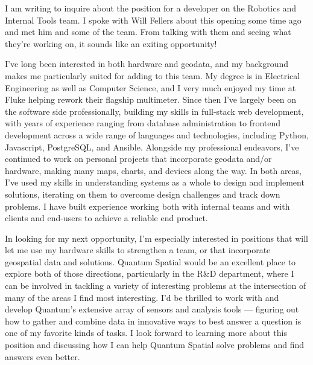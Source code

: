 \documentclass[10pt,stdletter,dateno,sigleft]{newlfm} %
\begin{document}
\begin{newlfm}


I am writing to inquire about the position for a developer on the Robotics and Internal Tools team. I spoke with Will Fellers about this opening some time ago and met him and some of the team. From talking with them and seeing what they're working on, it sounds like an exiting opportunity!

I've long been interested in both hardware and geodata, and my background makes me particularly suited for adding to this team. My degree is in Electrical Engineering as well as Computer Science, and I very much enjoyed my time at Fluke helping rework their flagship multimeter. Since then I've largely been on the software side professionally, building my skills in full-stack web development, with years of experience ranging from database administration to frontend development across a wide range of languages and technologies, including Python, Javascript, PostgreSQL, and Ansible. Alongside my professional endeavors, I've continued to work on personal projects that incorporate geodata and/or hardware, making many maps, charts, and devices along the way. In both areas, I've used my skills in understanding systems as a whole to design and implement solutions, iterating on them to overcome design challenges and track down problems. I have built experience working both with internal teams and with clients and end-users to achieve a reliable end product.

In looking for my next opportunity, I'm especially interested in positions that will let me use my hardware skills to strengthen a team, or that incorporate geospatial data and solutions. Quantum Spatial would be an excellent place to explore both of those directions, particularly in the R\&D department, where I can be involved in tackling a variety of interesting problems at the intersection of many of the areas I find most interesting. I'd be thrilled to work with and develop Quantum's extensive array of sensors and analysis tools — figuring out how to gather and combine data in innovative ways to best answer a question is one of my favorite kinds of tasks. I look forward to learning more about this position and discussing how I can help Quantum Spatial solve problems and find answers even better.


\end{newlfm}
\end{document}
